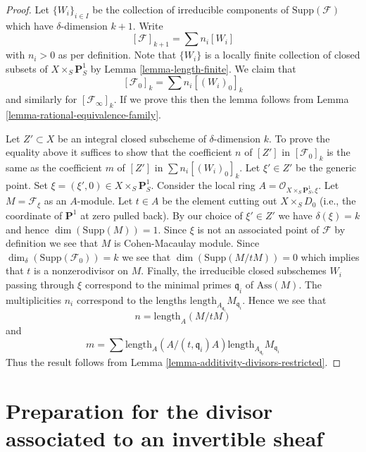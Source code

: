 \begin{proof}
Let $\{W_i\}_{i \in I}$ be the collection of irreducible
components of $\text{Supp}(\mathcal{F})$
which have $\delta$-dimension $k + 1$.
Write
$$
[\mathcal{F}]_{k + 1} = \sum n_i[W_i]
$$
with $n_i > 0$ as per definition. Note that $\{W_i\}$
is a locally finite collection of closed subsets of
$X \times_S \mathbf{P}^1_S$ by Lemma \ref{lemma-length-finite}.
We claim that
$$
[\mathcal{F}_0]_k = \sum n_i[(W_i)_0]_k
$$
and similarly for $[\mathcal{F}_\infty]_k$. If we prove this then the lemma
follows from Lemma \ref{lemma-rational-equivalence-family}.

\medskip\noindent
Let $Z' \subset X$ be an integral closed subscheme of $\delta$-dimension $k$.
To prove the equality above it suffices to show that the coefficient $n$
of $[Z']$ in $[\mathcal{F}_0]_k$ is the same as the coefficient $m$ of
$[Z']$ in $\sum n_i[(W_i)_0]_k$. Let $\xi' \in Z'$ be the generic point.
Set $\xi = (\xi', 0) \in  X \times_S \mathbf{P}^1_S$.
Consider the local ring $A = \mathcal{O}_{X \times_S \mathbf{P}^1_S, \xi}$.
Let $M = \mathcal{F}_\xi$ as an $A$-module.
Let $t \in A$ be the element cutting out $X \times_S D_0$
(i.e., the coordinate of $\mathbf{P}^1$ at zero pulled back).
By our choice of $\xi' \in Z'$ we have $\delta(\xi) = k$
and hence $\dim(\text{Supp}(M)) = 1$. Since $\xi$ is not an associated point
of $\mathcal{F}$ by definition we see that $M$ is Cohen-Macaulay module.
Since $\dim_\delta(\text{Supp}(\mathcal{F}_0)) = k$
we see that $\dim(\text{Supp}(M/tM)) = 0$ which implies that $t$
is a nonzerodivisor on $M$. Finally, the irreducible closed subschemes
$W_i$ passing through $\xi$ correspond to the minimal primes
$\mathfrak q_i$ of $\text{Ass}(M)$. The multiplicities $n_i$ correspond
to the lengths $\text{length}_{A_{\mathfrak q_i}}M_{\mathfrak q_i}$.
Hence we see that
$$
n = \text{length}_A(M/tM)
$$
and
$$
m = \sum
\text{length}_A(A/(t, \mathfrak q_i)A)
\text{length}_{A_{\mathfrak q_i}}M_{\mathfrak q_i}
$$
Thus the result follows from
Lemma \ref{lemma-additivity-divisors-restricted}.
\end{proof}


















\section{Preparation for the divisor associated to an invertible sheaf}
\label{section-preparation-divisor-sheaf}

